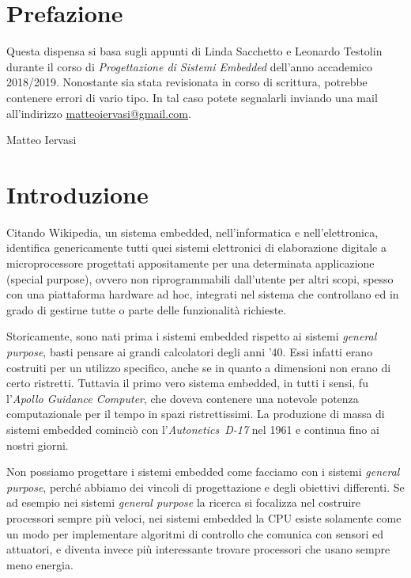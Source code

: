 \documentclass[10pt,a4paper,oneside]{scrbook}
\begin{document}
\begin{frontespizio}
\end{frontespizio}

\tableofcontents
\newpage

\chapter*{Prefazione}
Questa dispensa si basa sugli appunti di Linda Sacchetto e Leonardo Testolin durante il
corso di \textit{Progettazione di Sistemi Embedded} dell'anno accademico 2018/2019.
Nonostante sia stata revisionata in corso di scrittura, potrebbe contenere errori di vario tipo.
In tal caso potete segnalarli inviando una mail all'indirizzo \href{mailto:matteoiervasi@gmail.com}{matteoiervasi@gmail.com}.

\hspace*{\fill} Matteo Iervasi

\chapter{Introduzione}
Citando Wikipedia, un sistema embedded, nell'informatica e nell'elettronica,
identifica genericamente tutti quei sistemi elettronici di elaborazione digitale a microprocessore progettati
appositamente per una determinata applicazione (special purpose), ovvero non riprogrammabili dall'utente per altri scopi,
spesso con una piattaforma hardware ad hoc, integrati nel sistema che controllano ed in grado di gestirne tutte o
parte delle funzionalità richieste.

Storicamente, sono nati prima i sistemi embedded rispetto ai sistemi \textit{general purpose}, basti pensare ai
grandi calcolatori degli anni '40. Essi infatti erano costruiti per un utilizzo specifico, anche se in quanto a 
dimensioni non erano di certo ristretti.
Tuttavia il primo vero sistema embedded, in tutti i sensi, fu l'\textit{Apollo Guidance Computer}, che doveva
contenere una notevole potenza computazionale per il tempo in spazi ristrettissimi. La produzione di massa di 
sistemi embedded cominciò con l'\textit{Autonetics~D-17} nel 1961 e continua fino ai nostri giorni.

Non possiamo progettare i sistemi embedded come facciamo con i sistemi \textit{general purpose}, perché abbiamo
dei vincoli di progettazione e degli obiettivi differenti. Se ad esempio nei sistemi \textit{general purpose} la
ricerca si focalizza nel costruire processori sempre più veloci, nei sistemi embedded la CPU esiste solamente come
un modo per implementare algoritmi di controllo che comunica con sensori ed attuatori, e diventa invece più 
interessante trovare processori che usano sempre meno energia.
\end{document}
